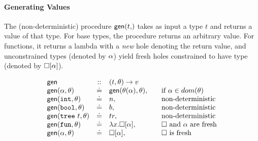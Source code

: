 \paragraph{Generating Values} The (non-deterministic) procedure $\gen{t}$
takes as input a type $t$ and returns a value of that type. For base
types, the procedure returns an arbitrary value. For functions, it returns
a lambda with a \emph{new} hole denoting the return value, and unconstrained
types (denoted by $\alpha$) yield fresh holes constrained to have type \thole
(denoted by $\square[\alpha]$). 

$$
\begin{array}{lcll}
\gensym       & ::  & (t, \tsu) \rightarrow v \\
\gen{\thole}{\tsu}  & \defeq  & \gen{\subst{\tsu}{\thole}}{\tsu}, & \quad \text{if } \thole \in dom(\tsu) \\
\gen{\tint}{\tsu}   & \defeq  & n, & \quad \text{non-deterministic} \\
\gen{\tbool}{\tsu}  & \defeq  & b, & \quad \text{non-deterministic} \\
\gen{\ttree{t}}{\tsu}  & \defeq  & tr, & \quad \text{non-deterministic} \\
\gen{\tfun}{\tsu}   & \defeq & \efun{x}{\vhole{\thole}}, & \quad \text{\ehole and \thole are fresh} \\
\gen{\thole}{\tsu}  & \defeq & \vhole{\thole}, & \quad \text{\ehole is fresh} \\
\end{array}
$$

